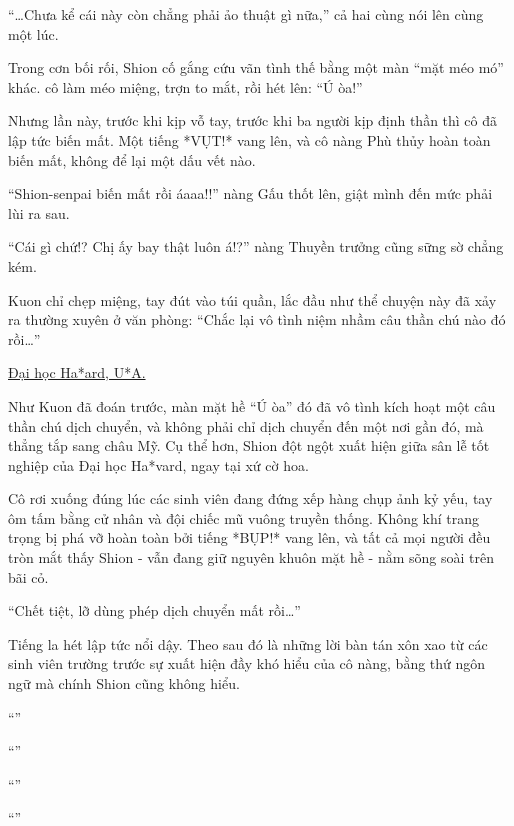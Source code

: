 \documentclass[../main.tex]{subfiles}
\begin{document}
``\dots Chưa kể cái này còn chẳng phải ảo thuật gì nữa,'' cả hai cùng nói lên cùng một lúc.

Trong cơn bối rối, Shion cố gắng cứu vãn tình thế bằng một màn ``mặt méo mó'' khác. cô làm méo miệng, trợn to mắt, rồi hét lên: ``Ú òa!''

Nhưng lần này, trước khi kịp vỗ tay, trước khi ba người kịp định thần thì cô đã lập tức biến mất. Một tiếng *VỤT!* vang lên, và cô nàng Phù thủy hoàn toàn biến mất, không để lại một dấu vết nào.


``Shion-senpai biến mất rồi áaaa!!'' nàng Gấu thốt lên, giật mình đến mức phải lùi ra sau.

``Cái gì chứ!? Chị ấy bay thật luôn á!?'' nàng Thuyền trưởng cũng sững sờ chẳng kém.

Kuon chỉ chẹp miệng, tay đút vào túi quần, lắc đầu như thể chuyện này đã xảy ra thường xuyên ở văn phòng: ``Chắc lại vô tình niệm nhầm câu thần chú nào đó rồi\dots''

\begin{center}
  \uline{Đại học Ha*ard, U*A.}
\end{center}

Như Kuon đã đoán trước, màn mặt hề ``Ú òa'' đó đã vô tình kích hoạt một câu thần chú dịch chuyển, và không phải chỉ dịch chuyển đến một nơi gần đó, mà thẳng tắp sang châu Mỹ. Cụ thể hơn, Shion đột ngột xuất hiện giữa sân lễ tốt nghiệp của Đại học Ha*vard, ngay tại xứ cờ hoa.

Cô rơi xuống đúng lúc các sinh viên đang đứng xếp hàng chụp ảnh kỷ yếu, tay ôm tấm bằng cử nhân và đội chiếc mũ vuông truyền thống. Không khí trang trọng bị phá vỡ hoàn toàn bởi tiếng *BỤP!* vang lên, và tất cả mọi người đều tròn mắt thấy Shion - vẫn đang giữ nguyên khuôn mặt hề - nằm sõng soài trên bãi cỏ.

``Chết tiệt, lỡ dùng phép dịch chuyển mất rồi\dots''

Tiếng la hét lập tức nổi dậy. Theo sau đó là những lời bàn tán xôn xao từ các sinh viên trường trước sự xuất hiện đầy khó hiểu của cô nàng, bằng thứ ngôn ngữ mà chính Shion cũng không hiểu.

``''

``''

``''

``''
\end{document}
